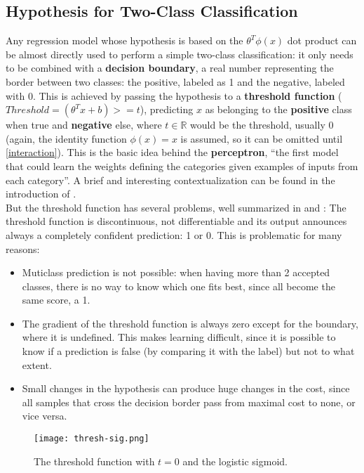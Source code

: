 \subsection{Hypothesis for Two-Class Classification}
Any regression model whose hypothesis is based on the \(\theta^T \phi(x)\) dot product can be almost directly used to perform a simple two-class classification: it only needs to be combined with a \textbf{decision boundary}, a real number representing the border between two classes: the positive, labeled as 1 and the negative, labeled with 0. This is achieved by passing the hypothesis to a \textbf{threshold function} (\(Threshold = (\theta^Tx+b)>=t\)), predicting \(x\) as belonging to the \textbf{positive} class when true and \textbf{negative} else, where \(t\in\mathbb{R}\) would be the threshold, usually 0 (again, the identity function \(\phi(x)=x\) is assumed, so it can be omitted until \ref{interaction}). This is the basic idea behind the \textbf{perceptron}\cite[p.729]{russell}, ``the first model that could learn the weights defining the categories given examples of inputs from each category''\cite[p.15]{goodfellow}. A brief and interesting contextualization can be found in the introduction of \cite{vapnik}.\\

But the threshold function has several problems, well summarized in \cite[ch.1]{nielsen} and \cite[p. 725]{russell}: The threshold function is discontinuous, not differentiable and its output announces always a completely confident prediction: 1 or 0. This is problematic for many reasons:
\begin{itemize}
\item Muticlass prediction is not possible: when having more than 2 accepted classes, there is no way to know which one fits best, since all become the same score, a 1.
\item The gradient of the threshold function is always zero except for the boundary, where it is undefined. This makes learning difficult, since it is possible to know if a prediction is false (by comparing it with the label) but not to what extent.
\item Small changes in the hypothesis can produce huge changes in the cost, since all samples that cross the decision border pass from maximal cost to none, or vice versa.
\end{itemize}


\begin{figure}[h]
  \centering
  \texttt{[image: thresh-sig.png]}
  \caption{The threshold function with \(t=0\) and the logistic sigmoid\cite{activation-funcs}.}
  \label{fig:sigmoid}
\end{figure}


